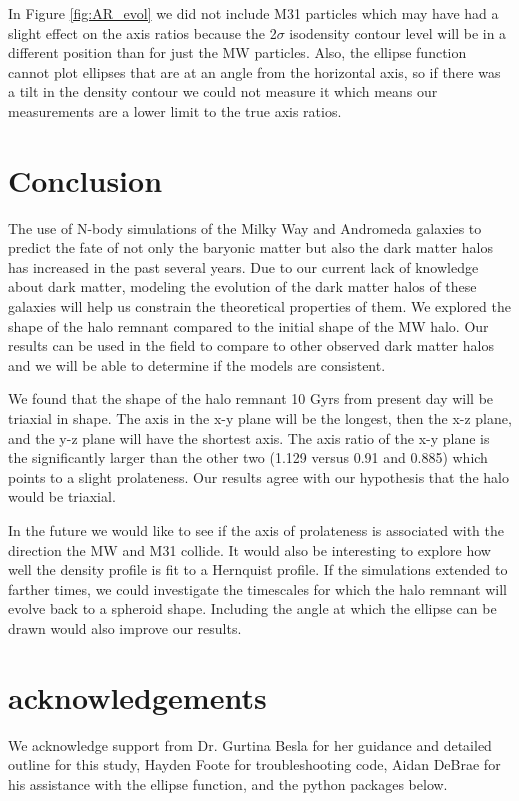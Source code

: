 \documentclass[linenumbers, twocolumn]{aastex631}
\begin{document}
In Figure \ref{fig:AR_evol} we did not include M31 particles which may have had a slight effect on the axis ratios because the 2$\sigma$ isodensity contour level will be in a different position than for just the MW particles. 
Also, the ellipse function cannot plot ellipses that are at an angle from the horizontal axis, so if there was a tilt in the density contour we could not measure it which means our measurements are a lower limit to the true axis ratios.

\section{Conclusion}
The use of N-body simulations of the Milky Way and Andromeda galaxies  to predict the fate of not only the baryonic matter but also the dark matter halos has increased in the past several years. 
Due to our current lack of knowledge about dark matter, modeling the evolution of the dark matter halos of these galaxies will help us constrain the theoretical properties of them.
We explored the shape of the halo remnant compared to the initial shape of the MW halo.
Our results can be used in the field to compare to other observed dark matter halos and we will be able to determine if the models are consistent.

We found that the shape of the halo remnant 10 Gyrs from present day will be triaxial in shape. 
The axis in the x-y plane will be the longest, then the x-z plane, and the y-z plane will have the shortest axis. 
The axis ratio of the x-y plane is the significantly larger than the other two (1.129 versus 0.91 and 0.885) which points to a slight prolateness.
Our results agree with our hypothesis that the halo would be triaxial. 


In the future we would like to see if the axis of prolateness is associated with the direction the MW and M31 collide. 
It would also be interesting to explore how well the density profile is fit to a Hernquist profile.
If the simulations extended to farther times, we could investigate the timescales for which the halo remnant will evolve back to a spheroid shape. Including the angle at which the ellipse can be drawn would also improve our results.



\section{acknowledgements}
We acknowledge support from Dr. Gurtina Besla for her guidance and detailed outline for this study, Hayden Foote for troubleshooting code, Aidan DeBrae for his assistance with the ellipse function, and the python packages below.
\end{document}
